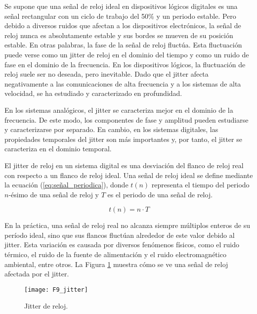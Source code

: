             Se supone que una señal de reloj ideal en dispositivos lógicos digitales es una señal rectangular con un ciclo de trabajo del 50\% y un periodo estable. Pero debido a diversos ruidos que afectan a los dispositivos electrónicos, la señal de reloj nunca es absolutamente estable y sus bordes se mueven de su posición estable. En otras palabras, la fase de la señal de reloj fluctúa. Esta fluctuación puede verse como un jitter de reloj en el dominio del tiempo y como un ruido de fase en el dominio de la frecuencia. En los dispositivos lógicos, la fluctuación de reloj suele ser no deseada, pero inevitable. Dado que el jitter afecta negativamente a las comunicaciones de alta frecuencia y a los sistemas de alta velocidad, se ha estudiado y caracterizado en profundidad.

            En los sistemas analógicos, el jitter se caracteriza mejor en el dominio de la frecuencia. De este modo, los componentes de fase y amplitud pueden estudiarse y caracterizarse por separado. En cambio, en los sistemas digitales, las propiedades temporales del jitter son más importantes y, por tanto, el jitter se caracteriza en el dominio temporal.

            El jitter de reloj en un sistema digital es una desviación del flanco de reloj real con respecto a un flanco de reloj ideal. Una señal de reloj ideal se define mediante la ecuación (\ref{eq:señal_periodica}), donde $t(n)$ representa el tiempo del periodo $n$-ésimo de una señal de reloj y $T$ es el periodo de una señal de reloj.

            \begin{equation}
                t(n) = n \cdot T 
                \label{eq:señal_periodica}
            \end{equation}

            En la práctica, una señal de reloj real no alcanza siempre múltiplos enteros de su período ideal, sino que sus flancos fluctúan alrededor de este valor debido al jitter. Esta variación es causada por diversos fenómenos físicos, como el ruido térmico, el ruido de la fuente de alimentación y el ruido electromagnético ambiental, entre otros. La Figura \ref{fig:F9_jitter} muestra cómo se ve una señal de reloj afectada por el jitter.

            \begin{figure}[hbtp]
                \caption{Jitter de reloj.}
                \centering
                \texttt{[image: F9\_jitter]}
                \label{fig:F9_jitter}
            \end{figure}
                
